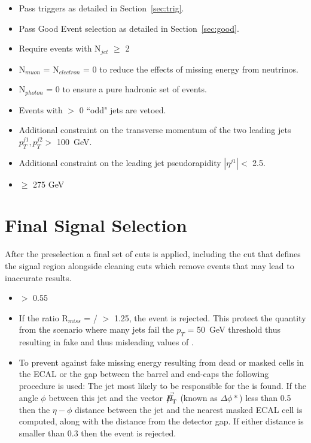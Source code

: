\begin{itemize}
\item Pass triggers as detailed in Section~\ref{sec:trig}.
\item Pass Good Event selection as detailed in Section~\ref{sec:good}.
\item{Require events with N$_{jet}$ $\geq$ 2}
\item N$_{muon}$ = N$_{electron}$ = 0 to reduce the effects of missing energy from neutrinos.
\item N$_{photon}$ = 0 to ensure a pure hadronic set of events.
\item Events with $>$ 0 ``odd" jets are vetoed.
\item Additional constraint on the transverse momentum of the two leading jets $p^{j1}_{T},p^{j2}_{T} >$ 100~GeV.
\item Additional constraint on the leading jet pseudorapidity $|\eta^{j1}| <$ 2.5.
\item \HT $\geq$ 275 GeV 
\end{itemize}



\section{Final Signal Selection}

After the preselection a final set of cuts is applied, including the \alt cut that defines the signal region alongside cleaning cuts which remove events that may lead to inaccurate results. 

\begin{itemize}
\item \alt $>$ 0.55
\item{If the ratio R$_{miss}$ = \mht / \met $>$ 1.25, the event is rejected. This protect the quantity \alt from the scenario where many jets fail the $p_{T}$ = 50~GeV threshold thus resulting in fake \mht and thus misleading values of \alt. }
\item{To prevent against fake missing energy resulting from dead or masked cells in the ECAL or the gap between the barrel and end-caps the following procedure is used: The jet most likely to be responsible for the \MHT is found. If the angle $\phi$ between this jet and the vector $\vec{\MHT}$ (known as $\Delta \phi*$) less than 0.5 then the $\eta-\phi$ distance between the jet and the nearest masked ECAL cell is computed, along with the distance from the detector gap. If either distance is smaller than 0.3 then the event is rejected. }

\end{itemize}




